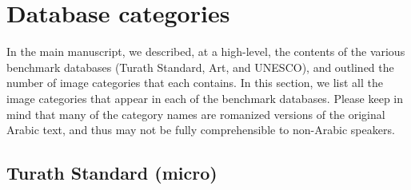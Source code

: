 \documentclass{article}
\begin{document}
\clearpage

\appendix

\section{Database categories}
\label{appendix:database_categories}

In the main manuscript, we described, at a high-level, the contents of the various benchmark databases (Turath Standard, Art, and UNESCO), and outlined the number of image categories that each contains. In this section, we list all the image categories that appear in each of the benchmark databases. Please keep in mind that many of the category names are romanized versions of the original Arabic text, and thus may not be fully comprehensible to non-Arabic speakers.

\subsection{Turath Standard (micro)}
\end{document}
